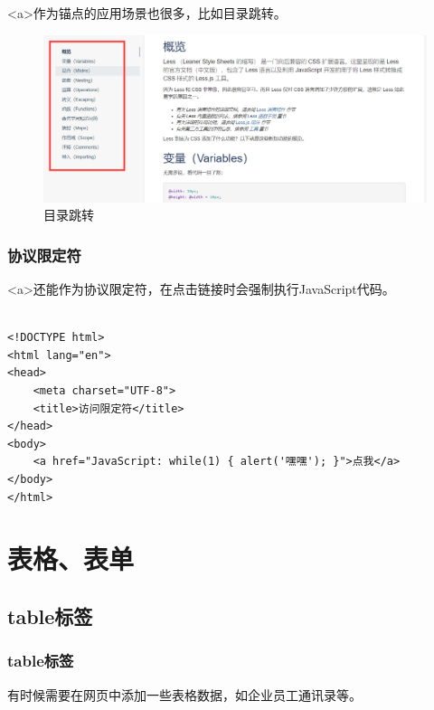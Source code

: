 <a>作为锚点的应用场景也很多，比如目录跳转。

\begin{figure}[H]
	\centering
	\includegraphics[scale=0.35]{img/C3/3-4/1.png}
	\caption{目录跳转}
\end{figure}

\vspace{0.5cm}

\subsection{协议限定符}

<a>还能作为协议限定符，在点击链接时会强制执行JavaScript代码。\\

\\

\begin{lstlisting}[style=htmlcssjs]
<!DOCTYPE html>
<html lang="en">
<head>
    <meta charset="UTF-8">
    <title>访问限定符</title>
</head>
<body>
    <a href="JavaScript: while(1) { alert('嘿嘿'); }">点我</a>
</body>
</html>
\end{lstlisting}

\newpage

\chapter{表格、表单}

\section{table标签}

\subsection{table标签}

有时候需要在网页中添加一些表格数据，如企业员工通讯录等。\\

